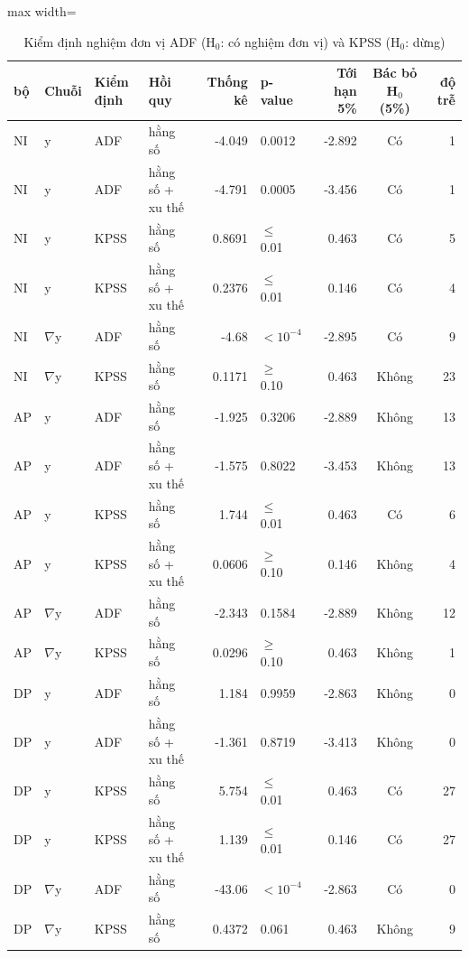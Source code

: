 \begin{table}[H]
\centering\scriptsize
\caption{Kiểm định nghiệm đơn vị ADF (H$_0$: có nghiệm đơn vị) và KPSS (H$_0$: dừng)}\label{tab:tab_b12_04_unit_root_tests}
\begin{adjustbox}{max width=\linewidth}
\begin{tabular}{llllrlrcr}
\toprule
bộ & Chuỗi & Kiểm định & Hồi quy & Thống kê & p-value & Tới hạn 5\% & Bác bỏ H$_{0}$ (5\%) & độ trễ \\
\midrule
NI & y & ADF & hằng số & -4.049 & 0.0012 & -2.892 & Có & 1 \\
NI & y & ADF & hằng số + xu thế & -4.791 & 0.0005 & -3.456 & Có & 1 \\
NI & y & KPSS & hằng số & 0.8691 & $\le$ 0.01 & 0.463 & Có & 5 \\
NI & y & KPSS & hằng số + xu thế & 0.2376 & $\le$ 0.01 & 0.146 & Có & 4 \\
NI & $\nabla$y & ADF & hằng số & -4.68 & $<10^{-4}$ & -2.895 & Có & 9 \\
NI & $\nabla$y & KPSS & hằng số & 0.1171 & $\ge$ 0.10 & 0.463 & Không & 23 \\
AP & y & ADF & hằng số & -1.925 & 0.3206 & -2.889 & Không & 13 \\
AP & y & ADF & hằng số + xu thế & -1.575 & 0.8022 & -3.453 & Không & 13 \\
AP & y & KPSS & hằng số & 1.744 & $\le$ 0.01 & 0.463 & Có & 6 \\
AP & y & KPSS & hằng số + xu thế & 0.0606 & $\ge$ 0.10 & 0.146 & Không & 4 \\
AP & $\nabla$y & ADF & hằng số & -2.343 & 0.1584 & -2.889 & Không & 12 \\
AP & $\nabla$y & KPSS & hằng số & 0.0296 & $\ge$ 0.10 & 0.463 & Không & 1 \\
DP & y & ADF & hằng số & 1.184 & 0.9959 & -2.863 & Không & 0 \\
DP & y & ADF & hằng số + xu thế & -1.361 & 0.8719 & -3.413 & Không & 0 \\
DP & y & KPSS & hằng số & 5.754 & $\le$ 0.01 & 0.463 & Có & 27 \\
DP & y & KPSS & hằng số + xu thế & 1.139 & $\le$ 0.01 & 0.146 & Có & 27 \\
DP & $\nabla$y & ADF & hằng số & -43.06 & $<10^{-4}$ & -2.863 & Có & 0 \\
DP & $\nabla$y & KPSS & hằng số & 0.4372 & 0.061 & 0.463 & Không & 9 \\
\bottomrule
\end{tabular}
\end{adjustbox}\par{}
\end{table}
